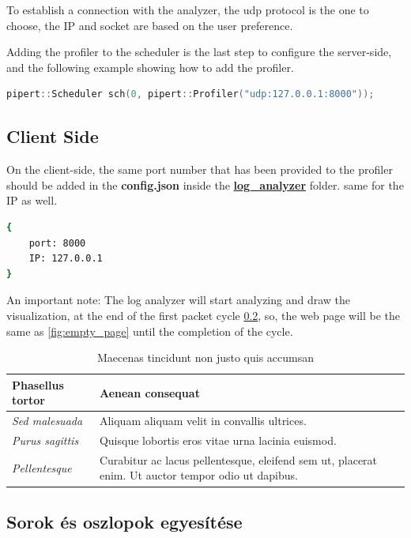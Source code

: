 To establish a connection with the analyzer, the udp protocol
is the one to choose, the IP and socket are based on the user
preference.

Adding the profiler to the scheduler is the last step to configure
the server-side, and the following example showing how to add the profiler.

\begin{lstlisting}[language=c++]
	pipert::Scheduler sch(0, pipert::Profiler("udp:127.0.0.1:8000"));
\end{lstlisting}

\subsection{Client Side}
On the client-side, the same port number that has been provided to the profiler
should be added in the \textbf{config.json} inside the \textbf{\url{log_analyzer}} folder. same for
the IP as well.

\begin{lstlisting}[language=bash]
{
	port: 8000
	IP: 127.0.0.1
}
\end{lstlisting}

An important note: The log analyzer will start analyzing and
draw the visualization, at the end of the first packet cycle \ref{}, so, 
the web page will be the same as \ref{fig:empty_page} 
until the completion of the cycle.


\begin{table}[H]
	\centering
	\begin{tabular}{ | m{} | m{} | }
		\hline
		\textbf{Phasellus tortor} & \textbf{Aenean consequat} \\
		\hline \hline
		\emph{Sed malesuada} & Aliquam aliquam velit in convallis ultrices. \\
		\hline
		\emph{Purus sagittis} &  Quisque lobortis eros vitae urna lacinia euismod. \\
		\hline
		\emph{Pellentesque} & Curabitur ac lacus pellentesque, eleifend sem ut, placerat enim. Ut auctor tempor odio ut dapibus. \\
		\hline
	\end{tabular}
	\caption{Maecenas tincidunt non justo quis accumsan}
	\label{tab:example-1}
\end{table}

\subsection{Sorok és oszlopok egyesítése} %

